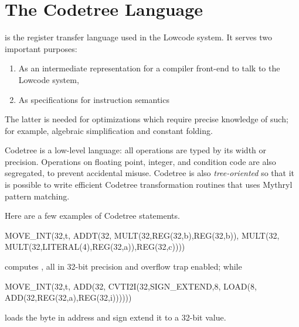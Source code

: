 \section{The Codetree Language}

 is the 
register transfer language used in the Lowcode system.
It serves two important purposes:
\begin{enumerate}
\item As an intermediate representation for a compiler front-end 
  to talk to the Lowcode system,
\item As specifications for instruction semantics
\end{enumerate}
The latter is needed for optimizations which require precise knowledge of such;
for example, algebraic simplification and constant folding.

Codetree is a low-level  language: 
all operations are typed by its width or precision.  
Operations on floating point, integer, and condition code 
are also segregated, to prevent accidental misuse. 
Codetree is also \emph{tree-oriented} so that it is possible to write efficient
Codetree transformation routines that uses Mythryl pattern matching.

Here are a few examples of Codetree statements.
\begin{SML}
   MOVE_INT(32,t,
      ADDT(32,
        MULT(32,REG(32,b),REG(32,b)),
        MULT(32,
          MULT(32,LITERAL(4),REG(32,a)),REG(32,c))))
\end{SML}
computes , all in 32-bit precision and overflow
trap enabled; while
\begin{SML}
   MOVE_INT(32,t,
      ADD(32,
        CVTI2I(32,SIGN_EXTEND,8,
          LOAD(8,
            ADD(32,REG(32,a),REG(32,i))))))
\end{SML}
loads the byte in address  and sign extend it to a 32-bit
value. 

